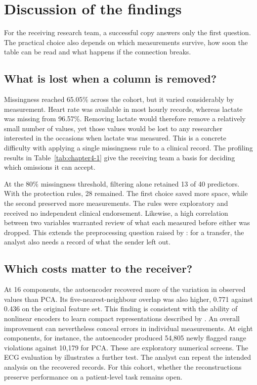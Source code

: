 \section{Discussion of the findings}\label{sec:discussion}
\noindent For the receiving research team, a successful copy answers only the first question. The practical choice also depends on which measurements survive, how soon the table can be read and what happens if the connection breaks.

\subsection{What is lost when a column is removed?}
Missingness reached 65.05\% across the cohort, but it varied considerably by measurement. Heart rate was available in most hourly records, whereas lactate was missing from 96.57\%. Removing lactate would therefore remove a relatively small number of values, yet those values would be lost to any researcher interested in the occasions when lactate was measured. This is a concrete difficulty with applying a single missingness rule to a clinical record. The profiling results in Table~\ref{tab:chapter4-1} give the receiving team a basis for deciding which omissions it can accept.

At the 80\% missingness threshold, filtering alone retained 13 of 40 predictors. With the protection rules, 28 remained. The first choice saved more space, while the second preserved more measurements. The rules were exploratory and received no independent clinical endorsement. Likewise, a high correlation between two variables warranted review of what each measured before either was dropped. This extends the preprocessing question raised by \citet{Tang2020}: for a transfer, the analyst also needs a record of what the sender left out.

\subsection{Which costs matter to the receiver?}
At 16 components, the autoencoder recovered more of the variation in observed values than PCA. Its five-nearest-neighbour overlap was also higher, 0.771 against 0.436 on the original feature set. This finding is consistent with the ability of nonlinear encoders to learn compact representations described by \citet{Hinton2006}. An overall improvement can nevertheless conceal errors in individual measurements. At eight components, for instance, the autoencoder produced 54,805 newly flagged range violations against 10,179 for PCA. These are exploratory numerical screens. The ECG evaluation by \citet{Guan2026} illustrates a further test. The analyst can repeat the intended analysis on the recovered records. For this cohort, whether the reconstructions preserve performance on a patient-level task remains open.

